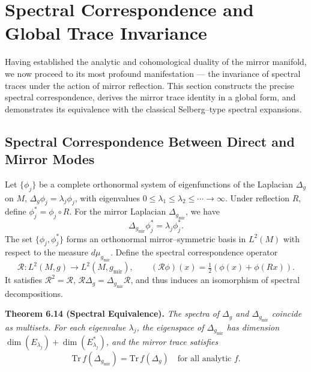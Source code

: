\section{Spectral Correspondence and Global Trace Invariance}\relax \hspace{0pt}

Having established the analytic and cohomological duality of the mirror manifold,
we now proceed to its most profound manifestation —
the invariance of spectral traces under the action of mirror reflection.
This section constructs the precise spectral correspondence,
derives the mirror trace identity in a global form,
and demonstrates its equivalence with the classical Selberg–type
spectral expansions.

\subsection{Spectral Correspondence Between Direct and Mirror Modes}\relax \hspace{0pt}

Let \(\{\phi_j\}\) be a complete orthonormal system
of eigenfunctions of the Laplacian \(\Delta_g\) on \(M\),
\(\Delta_g\phi_j = \lambda_j \phi_j\),
with eigenvalues \(0 \le \lambda_1 \le \lambda_2 \le \cdots \to \infty\).
Under reflection \(R\), define \(\phi_j^{*} = \phi_j\circ R\).
For the mirror Laplacian \(\Delta_{g_{\mathrm{mir}}}\),
we have
\begin{equation}
\Delta_{g_{\mathrm{mir}}}\phi_j^{*} = \lambda_j \phi_j^{*}.
\end{equation}
The set \(\{\phi_j, \phi_j^{*}\}\)
forms an orthonormal mirror–symmetric basis in \(L^{2}(M)\)
with respect to the measure \(d\mu_{g_{\mathrm{mir}}}\).
Define the spectral correspondence operator
\[
\mathcal{R}: L^{2}(M,g) \to L^{2}(M,g_{\mathrm{mir}}),
\qquad (\mathcal{R}\phi)(x) = \tfrac{1}{2}(\phi(x) + \phi(Rx)).
\]
It satisfies \(\mathcal{R}^{2} = \mathcal{R}\),
\(\mathcal{R}\Delta_{g} = \Delta_{g_{\mathrm{mir}}}\mathcal{R}\),
and thus induces an isomorphism of spectral decompositions.

\noindent
\textbf{Theorem 6.14 (Spectral Equivalence).}
\emph{The spectra of \(\Delta_g\) and \(\Delta_{g_{\mathrm{mir}}}\)
coincide as multisets.
For each eigenvalue \(\lambda_j\),
the eigenspace of \(\Delta_{g_{\mathrm{mir}}}\) has dimension
\(\dim(E_{\lambda_j}) + \dim(E_{\lambda_j}^{*})\),
and the mirror trace satisfies}
\[
\mathrm{Tr}\,f(\Delta_{g_{\mathrm{mir}}})
=\mathrm{Tr}\,f(\Delta_g)
\quad \text{for all analytic } f.
\]

